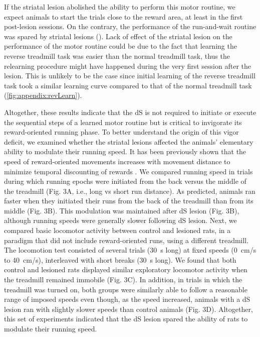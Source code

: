If the striatal lesion abolished the ability to perform this motor routine, we expect animals to start the trials close to the reward area, at least in the first post-lesion sessions.
On the contrary, the performance of the run-and-wait routine was spared by striatal lesions ().
Lack of effect of the striatal lesion on the performance of the motor routine could be due to the fact that learning the reverse treadmill task was easier than the normal treadmill task, thus the relearning procedure might have happened during the very first session after the lesion.
This is unlikely to be the case since initial learning of the reverse treadmill task took a similar learning curve compared to that of the normal treadmill task (\autoref{fig:appendix:revLearn}).


\par
Altogether, these results indicate that the dS is not required to initiate or execute the sequential steps of a learned motor routine but is critical to invigorate its reward-oriented running phase.
To better understand the origin of this vigor deficit, we examined whether the striatal lesions affected the animals' elementary ability to modulate their running speed.
It has been previously shown that the speed of reward-oriented movements increases with movement distance to minimize temporal discounting of rewards \cite{Shadmehr2010JN, Reppert2018JNPhys}.
We compared running speed in trials during which running epochs were initiated from the back versus the middle of the treadmill (Fig. 3A, i.e., long vs short run distance).
As predicted, animals ran faster when they initiated their runs from the back of the treadmill than from its middle (Fig. 3B). This modulation was maintained after dS lesion (Fig. 3B), although running speeds were generally slower following dS lesion.
Next, we compared basic locomotor activity between control and lesioned rats, in a paradigm that did not include reward-oriented runs, using a different treadmill.
The locomotion test consisted of several trials (30~s long) at fixed speeds (0~cm/s to 40~cm/s), interleaved with short breaks (30~s long).
We found that both control and lesioned rats displayed similar exploratory locomotor activity when the treadmill remained immobile (Fig. 3C).
In addition, in trials in which the treadmill was turned on, both groups were similarly able to follow a reasonable range of imposed speeds even though, as the speed increased, animals with a dS lesion ran with slightly slower speeds than control animals (Fig. 3D).
Altogether, this set of experiments indicated that the dS lesion spared the ability of rats to modulate their running speed.







